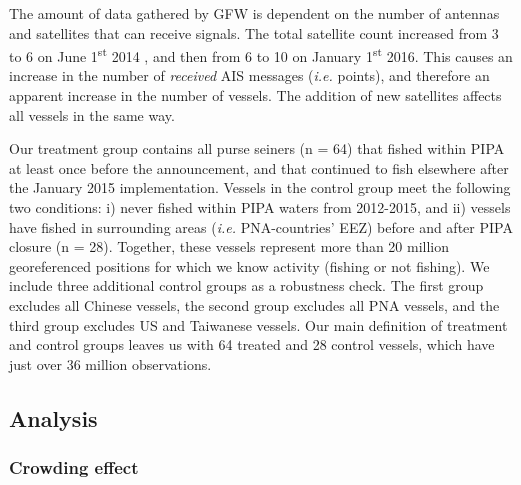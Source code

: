 \documentclass[9p,twocolumn,twoside,lineno]{pnas-new}
\begin{document}
The amount of data gathered by GFW is dependent on the number of antennas and satellites that can receive signals. The total satellite count increased from 3 to 6 on June 1\textsuperscript{st} 2014 , and then from 6 to 10 on January 1\textsuperscript{st} 2016. This causes an increase in the number of \emph{received} AIS messages (\emph{i.e.} points), and therefore an apparent increase in the number of vessels. The addition of new satellites affects all vessels in the same way.


Our treatment group contains all purse seiners (n = 64) that fished within PIPA at least once before the announcement, and that continued to fish elsewhere after the January 2015 implementation. Vessels in the control group meet the following two conditions: i) never fished within PIPA waters from 2012-2015, and ii) vessels have fished in surrounding areas (\emph{i.e.} PNA-countries' EEZ) before and after PIPA closure (n = 28). Together, these vessels represent more than 20 million georeferenced positions for which we know activity (fishing or not fishing). We include three additional control groups as a robustness check. The first group excludes all Chinese vessels, the second group excludes all PNA vessels, and the third group excludes US and Taiwanese vessels. Our main definition of treatment and control groups leaves us with 64 treated and 28 control vessels, which have just over 36 million observations.

\subsection{Analysis}

\subsubsection{Crowding effect}
\end{document}
